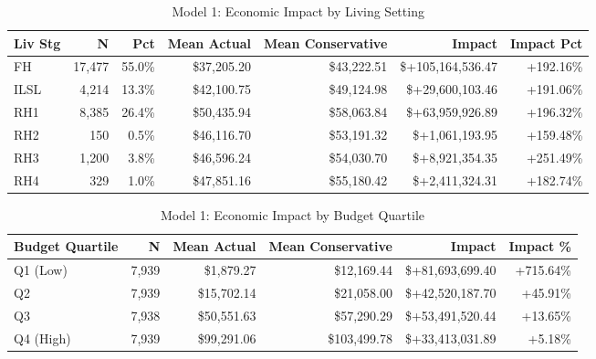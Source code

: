 \begin{table}[htbp]
\centering
\small
\caption{Model 1: Economic Impact by Living Setting}
\label{tab:model1_impact_living}
\begin{tabular}{lrrrrrr}  
\toprule
\textbf{Liv Stg} & \textbf{N} & \textbf{Pct} & \textbf{Mean Actual} & \textbf{Mean Conservative} & \textbf{Impact} & \textbf{Impact Pct} \\
\midrule
FH & 17,477 & 55.0\% & \$37,205.20 & \$43,222.51 & \$+105,164,536.47 & +192.16\% \\
ILSL & 4,214 & 13.3\% & \$42,100.75 & \$49,124.98 & \$+29,600,103.46 & +191.06\% \\
RH1 & 8,385 & 26.4\% & \$50,435.94 & \$58,063.84 & \$+63,959,926.89 & +196.32\% \\
RH2 & 150 & 0.5\% & \$46,116.70 & \$53,191.32 & \$+1,061,193.95 & +159.48\% \\
RH3 & 1,200 & 3.8\% & \$46,596.24 & \$54,030.70 & \$+8,921,354.35 & +251.49\% \\
RH4 & 329 & 1.0\% & \$47,851.16 & \$55,180.42 & \$+2,411,324.31 & +182.74\% \\
\bottomrule
\end{tabular}
\end{table}

\begin{table}[htbp]
\centering
\small
\caption{Model 1: Economic Impact by Budget Quartile}
\label{tab:model1_impact_quartile}
\begin{tabular}{lrrrrr}
\toprule
\textbf{Budget Quartile} & \textbf{N} & \textbf{Mean Actual} & \textbf{Mean Conservative} & \textbf{Impact} & \textbf{Impact \%} \\
\midrule
Q1 (Low) & 7,939 & \$1,879.27 & \$12,169.44 & \$+81,693,699.40 & +715.64\% \\
Q2 & 7,939 & \$15,702.14 & \$21,058.00 & \$+42,520,187.70 & +45.91\% \\
Q3 & 7,938 & \$50,551.63 & \$57,290.29 & \$+53,491,520.44 & +13.65\% \\
Q4 (High) & 7,939 & \$99,291.06 & \$103,499.78 & \$+33,413,031.89 & +5.18\% \\
\bottomrule
\end{tabular}
\end{table}

